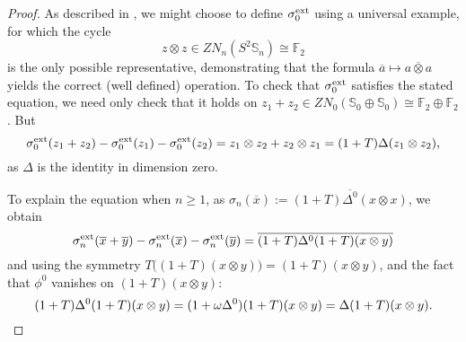 \documentclass[11pt]{amsart}
\theoremstyle{plain}
\theoremstyle{definition}
\let\oldphi\phi
\let\phi\varphi
\theoremstyle{plain}
\newcommand{\F}{\mathbb{F}}
\begin{document}
\begin{Constructing homotopy and cohomotopy operations}
\begin{proof}
As described in \cite[\S3]{MR1089001}, we might choose to define $\sigma^\textup{ext}_0$ using a universal example, for which the cycle 
\[z\otimes z\in ZN_n(S^2\mathbb{S}_n)\cong \F_2\]
is the only possible representative, demonstrating that the formula $\overline{a}\mapsto \overline{a\otimes a}$ yields the correct (well defined) operation. To check that $\sigma_0^\textup{ext}$ satisfies the stated equation, we need only check that it holds on $z_1+z_2\in ZN_0(\mathbb{S}_0\oplus \mathbb{S}_0)\cong \F_2\oplus \F_2$. But
\[\sigma_0^\textup{ext}(z_1+z_2)-\sigma_0^\textup{ext}(z_1)-\sigma_0^\textup{ext}(z_2)=z_1\otimes z_2+z_2\otimes z_1=(1+T)\Delta(z_1\otimes z_2),\]
as $\Delta$ is the identity in dimension zero.

To explain the equation when $n\geq1$, as $\sigma_n(\overline{x}):=\overline{(1+T)\Delta^0(x\otimes x)}$, we obtain %
\[\sigma_n^\textup{ext}(\overline{x}+\overline{y})-\sigma_n^\textup{ext}(\overline{x})-\sigma_n^\textup{ext}(\overline{y})
=
\overline{(1+T)\Delta^0(1+T)(x\otimes y)}\]
and using the symmetry  $T\bigl((1+T)(x\otimes y)\bigr)=(1+T)(x\otimes y)$, and the fact that $\oldphi^0$ vanishes on $(1+T)(x\otimes y)$:
\[
(1+T)\Delta^0(1+T)(x\otimes y)
=
(1+\omega\Delta^0)(1+T)(x\otimes y)
=
\Delta(1+T)(x\otimes y).\qedhere
\]
\end{proof}


\end{Constructing homotopy and cohomotopy operations}
\end{document}
